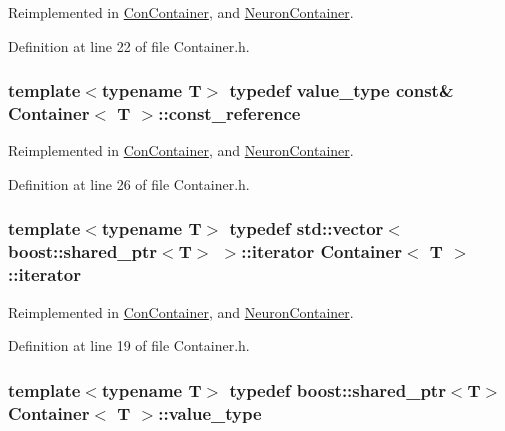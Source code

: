 Reimplemented in \hyperlink{class_con_container_ac314ee4e351b3a5f595cd1de74fb3b5e}{ConContainer}, and \hyperlink{class_neuron_container_a41749602f05e7610da7f0f1fd59f5442}{NeuronContainer}.



Definition at line 22 of file Container.h.

\hypertarget{class_container_a8dd7ae9d0687e11d873f98206e961ac1}{
\subsubsection[{const\_\-reference}]{\setlength{\rightskip}{0pt plus 5cm}template$<$typename T$>$ typedef {\bf value\_\-type} const\& {\bf Container}$<$ T $>$::{\bf const\_\-reference}}}
\label{class_container_a8dd7ae9d0687e11d873f98206e961ac1}


Reimplemented in \hyperlink{class_con_container_ac644eca2f5ee432a6070fd1d397b3741}{ConContainer}, and \hyperlink{class_neuron_container_a468ffbb00b15553f73da46dd62c91c8d}{NeuronContainer}.



Definition at line 26 of file Container.h.

\hypertarget{class_container_afe880028d8304353129f47cd1d28c20a}{
\subsubsection[{iterator}]{\setlength{\rightskip}{0pt plus 5cm}template$<$typename T$>$ typedef std::vector$<$boost::shared\_\-ptr$<$T$>$ $>$::{\bf iterator} {\bf Container}$<$ T $>$::{\bf iterator}}}
\label{class_container_afe880028d8304353129f47cd1d28c20a}


Reimplemented in \hyperlink{class_con_container_a5dc8aab66a22fc25b7e700b51265b577}{ConContainer}, and \hyperlink{class_neuron_container_abf81356adaea3bfc64aa03777e9a8def}{NeuronContainer}.



Definition at line 19 of file Container.h.

\hypertarget{class_container_aa44714b9a736d2cfd2e01a87ad1c001b}{
\subsubsection[{value\_\-type}]{\setlength{\rightskip}{0pt plus 5cm}template$<$typename T$>$ typedef boost::shared\_\-ptr$<$T$>$ {\bf Container}$<$ T $>$::{\bf value\_\-type}}}
\label{class_container_aa44714b9a736d2cfd2e01a87ad1c001b}



